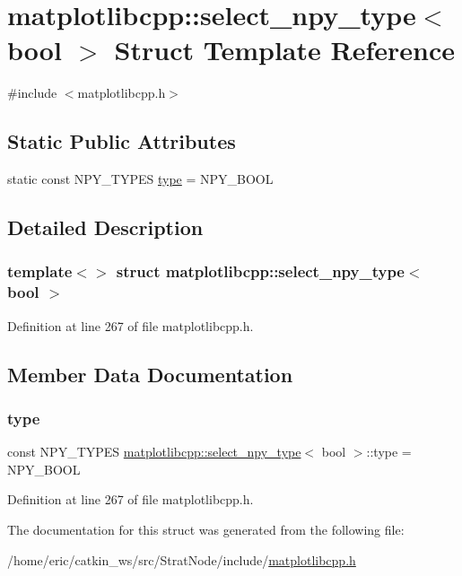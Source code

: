 \hypertarget{structmatplotlibcpp_1_1select__npy__type_3_01bool_01_4}{}\section{matplotlibcpp\+::select\+\_\+npy\+\_\+type$<$ bool $>$ Struct Template Reference}
\label{structmatplotlibcpp_1_1select__npy__type_3_01bool_01_4}


{\ttfamily \#include $<$matplotlibcpp.\+h$>$}

\subsection*{Static Public Attributes}
\begin{DoxyCompactItemize}
\item 
static const N\+P\+Y\+\_\+\+T\+Y\+P\+ES \mbox{\hyperlink{structmatplotlibcpp_1_1select__npy__type_3_01bool_01_4_a79dc3db61a3b0f4796a29d067d5dd374}{type}} = N\+P\+Y\+\_\+\+B\+O\+OL
\end{DoxyCompactItemize}


\subsection{Detailed Description}
\subsubsection*{template$<$$>$\newline
struct matplotlibcpp\+::select\+\_\+npy\+\_\+type$<$ bool $>$}



Definition at line 267 of file matplotlibcpp.\+h.



\subsection{Member Data Documentation}
\mbox{\label{structmatplotlibcpp_1_1select__npy__type_3_01bool_01_4_a79dc3db61a3b0f4796a29d067d5dd374}} 
\subsubsection{\texorpdfstring{type}{type}}
{\footnotesize\ttfamily const N\+P\+Y\+\_\+\+T\+Y\+P\+ES \mbox{\hyperlink{structmatplotlibcpp_1_1select__npy__type}{matplotlibcpp\+::select\+\_\+npy\+\_\+type}}$<$ bool $>$\+::type = N\+P\+Y\+\_\+\+B\+O\+OL\hspace{0.3cm}{\ttfamily [static]}}



Definition at line 267 of file matplotlibcpp.\+h.



The documentation for this struct was generated from the following file\+:\begin{DoxyCompactItemize}
\item 
/home/eric/catkin\+\_\+ws/src/\+Strat\+Node/include/\mbox{\hyperlink{matplotlibcpp_8h}{matplotlibcpp.\+h}}\end{DoxyCompactItemize}
